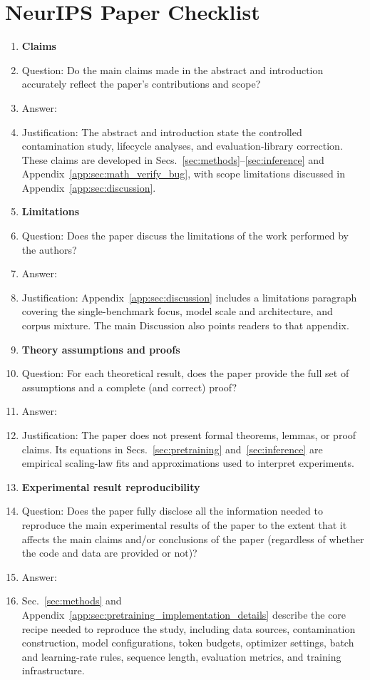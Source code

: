 \section*{NeurIPS Paper Checklist}

\begin{enumerate}

\item {\bf Claims}
    \item[] Question: Do the main claims made in the abstract and introduction accurately reflect the paper's contributions and scope?
    \item[] Answer: \answerYes{}
    \item[] Justification: The abstract and introduction state the controlled contamination study, lifecycle analyses, and evaluation-library correction. These claims are developed in Secs.~\ref{sec:methods}--\ref{sec:inference} and Appendix~\ref{app:sec:math_verify_bug}, with scope limitations discussed in Appendix~\ref{app:sec:discussion}.

\item {\bf Limitations}
    \item[] Question: Does the paper discuss the limitations of the work performed by the authors?
    \item[] Answer: \answerYes{}
    \item[] Justification: Appendix~\ref{app:sec:discussion} includes a limitations paragraph covering the single-benchmark focus, model scale and architecture, and corpus mixture. The main Discussion also points readers to that appendix.

\item {\bf Theory assumptions and proofs}
    \item[] Question: For each theoretical result, does the paper provide the full set of assumptions and a complete (and correct) proof?
    \item[] Answer: \answerNA{}
    \item[] Justification: The paper does not present formal theorems, lemmas, or proof claims. Its equations in Secs.~\ref{sec:pretraining} and~\ref{sec:inference} are empirical scaling-law fits and approximations used to interpret experiments.

    \item {\bf Experimental result reproducibility}
    \item[] Question: Does the paper fully disclose all the information needed to reproduce the main experimental results of the paper to the extent that it affects the main claims and/or conclusions of the paper (regardless of whether the code and data are provided or not)?
    \item[] Answer: \answerYes{}
    \item[] Sec.~\ref{sec:methods} and Appendix~\ref{app:sec:pretraining_implementation_details} describe the core recipe needed to reproduce the study, including data sources, contamination construction, model configurations, token budgets, optimizer settings, batch and learning-rate rules, sequence length, evaluation metrics, and training infrastructure.



\end{enumerate}

